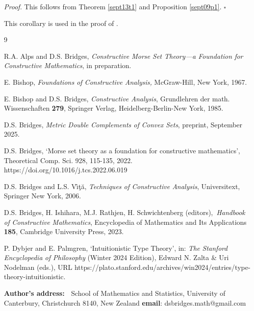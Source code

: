 \documentclass[11pt]{article}%
\newenvironment{proof}[1][Proof]{\noindent\textit{#1.} }{}
\begin{document}
\begin{proof}
This follows from Theorem \ref{sept13t1} and Proposition \ref{sept09p1}.%
\hfill
$\square$
\end{proof}

\label{e}This corollary is used in the proof of \cite[Proposition 8]{DSBmcom}.%

\bigskip
%

\bigskip


\begin{thebibliography}{9}                                                                                                %


R.A. Alps and D.S. Bridges, \emph{Constructive Morse Set
Theory---a Foundation for Constructive Mathematics}, in preparation.

E. Bishop, \emph{Foundations of Constructive Analysis,
}McGraw-Hill, New York, 1967.

E. Bishop and D.S. Bridges, \emph{Constructive Analysis},
Grundlehren der math. Wissenschaften \textbf{279}, Springer Verlag,
Heidelberg-Berlin-New York, 1985.

D.S. Bridges, \emph{Metric Double Complements of Convex
Sets}, preprint, September 2025.

D.S. Bridges, `Morse set theory as a foundation for
constructive mathematics', Theoretical Comp. Sci. 928, 115-135, 2022. https://doi.org/10.1016/j.tcs.2022.06.019

D.S. Bridges and L.S. V\^{\i}\c{t}\u{a}, \emph{Techniques of
Constructive Analysis}, Universitext, Springer New York, 2006.

D.S. Bridges, H. Ishihara, M.J. Rathjen, H. Schwichtenberg
(editors),\emph{\ Handbook of Constructive Mathematics}, Encyclopedia of
Mathematics and Its Applications \textbf{185}, Cambridge University Press, 2023.

P. Dybjer and E. Palmgren, `Intuitionistic Type Theory', in:
\emph{The Stanford Encyclopedia of Philosophy} (Winter 2024 Edition), Edward
N. Zalta \& Uri Nodelman (eds.), URL https://plato.stanford.edu/archives/win2024/entries/type-theory-intuitionistic.
\end{thebibliography}

%

\bigskip
%

\bigskip
%

\noindent
\textbf{Author's address: \ }School of Mathematics and Statistics, University
of Canterbury, Christchurch 8140, New Zealand%
\hfill
\textbf{email}: dsbridges.math@gmail.com
\end{document}
